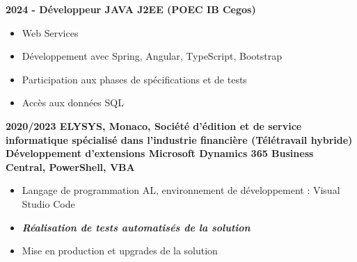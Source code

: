 \documentclass[10pt,a4paper]{article}
\newcommand{\myvspace}{\vspace{0.3cm}}
\begin{document}
\begin{minipage}[t]{0.65\textwidth}
    \textbf{2024 - Développeur JAVA J2EE (POEC IB Cegos) }
    \begin{itemize}[nosep, leftmargin=*, itemsep=0pt, parsep=0pt]
            \item Web Services 
            \item Développement avec Spring, Angular, TypeScript, Bootstrap 
            \item Participation aux phases de spécifications et de tests 
            \item Accès aux données SQL
    \end{itemize}
    \myvspace
    \textbf{2020/2023 ELYSYS, Monaco, Société d’édition et de service
    informatique spécialisé dans l’industrie financière (Télétravail hybride)
    Développement d’extensions Microsoft Dynamics 365 Business Central,
    PowerShell, VBA}
    \begin{itemize}[nosep, leftmargin=*, itemsep=0pt, parsep=0pt]
    \item Langage de programmation AL, environnement de développement : Visual Studio
    Code
    \item \textbf{\textit{Réalisation de tests automatisés de la solution}}
    \item Mise en production et upgrades de la solution
    \end{itemize}
    \myvspace
    

\end{minipage}
\end{document}

